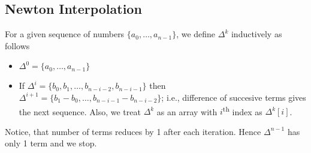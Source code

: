 \documentclass[../../Problems]{subfiles}
\begin{document}
\subsection{Newton Interpolation}{\label{pp:newtoninterpolation}}
For a given sequence of numbers $\{a_0,\ldots,a_{n-1}\}$, we define $\Delta ^{k}$ inductively as follows
\begin{itemize}
	\item $\Delta ^{0}=\{a_0,\ldots,a_{n-1}\}$
	\item If $\Delta ^{i}=\{b_0,b_1,\ldots,b_{n-i-2},b_{n-i-1}\}$ then $\Delta ^{i+1}=\{b_1-b_0,\ldots,b_{n-i-1}-b_{n-i-2}\}$; i.e., difference of succesive terms gives the next sequence. Also, we treat $\Delta ^{k}$ as an array with $i$\textsuperscript{th} index as $\Delta ^{k}[i]$.
\end{itemize}
Notice, that number of terms reduces by 1 after each iteration. Hence $\Delta ^{n-1}$ has only 1 term and we stop.
\end{document}
